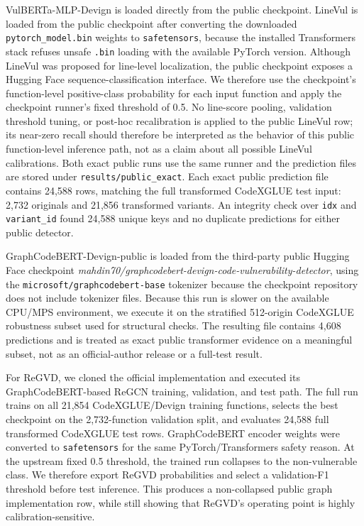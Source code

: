 \documentclass[a4paper,fleqn]{cas-dc}
\begin{document}
VulBERTa-MLP-Devign is loaded directly from the public checkpoint. LineVul is
loaded from the public checkpoint after converting the downloaded
\texttt{pytorch\_model.bin} weights to \texttt{safetensors}, because the
installed Transformers stack refuses unsafe \texttt{.bin} loading with the
available PyTorch version. Although LineVul was proposed for line-level
localization, the public checkpoint exposes a Hugging Face
sequence-classification interface. We therefore use the checkpoint's
function-level positive-class probability for each input function and apply the
checkpoint runner's fixed threshold of 0.5. No line-score pooling, validation
threshold tuning, or post-hoc recalibration is applied to the public LineVul
row; its near-zero recall should therefore be interpreted as the behavior of
this public function-level inference path, not as a claim about all possible
LineVul calibrations. Both exact public runs use the same runner and the
prediction files are stored under \texttt{results/public\_exact}. Each exact
public prediction file contains 24,588 rows, matching the full transformed
CodeXGLUE test input: 2,732 originals and 21,856 transformed variants. An
integrity check over \texttt{idx} and \texttt{variant\_id} found 24,588 unique
keys and no duplicate predictions for either public detector.

GraphCodeBERT-Devign-public is loaded from the third-party public Hugging Face checkpoint
\emph{mahdin70/graphcodebert-devign-code-vulnerability-detector}, using the
\texttt{microsoft/graphcodebert-base} tokenizer because the checkpoint
repository does not include tokenizer files. Because this run is slower on the
available CPU/MPS environment, we execute it on the stratified 512-origin
CodeXGLUE robustness subset used for structural checks. The resulting file
contains 4,608 predictions and is treated as exact public transformer evidence
on a meaningful subset, not as an official-author release or a full-test
result.

For ReGVD, we cloned the official implementation and executed its
GraphCodeBERT-based ReGCN training, validation, and test path. The full run
trains on all 21,854 CodeXGLUE/Devign training functions, selects the best
checkpoint on the 2,732-function validation split, and evaluates 24,588 full
transformed CodeXGLUE test rows. GraphCodeBERT encoder weights were converted
to \texttt{safetensors} for the same PyTorch/Transformers safety reason. At the
upstream fixed 0.5 threshold, the trained run collapses to the non-vulnerable
class. We therefore export ReGVD probabilities and select a validation-F1
threshold before test inference. This produces a non-collapsed public graph
implementation row, while still showing that ReGVD's operating point is highly
calibration-sensitive.
\end{document}
